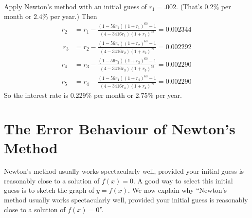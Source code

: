 \begin{eg}[interest rate]
Apply Newton's method with an initial guess of $r_1=.002$. 
(That's $0.2$\% per month or 2.4\% per year.) Then
\begin{align*}
r_2&=r_1-\frac{(1-56r_1)(1+r_1)^{60}-1}{(4-3416r_1)(1+r_1)^{59}}=0.002344\\\
r_3&=r_2-\frac{(1-56r_2)(1+r_2)^{60}-1}{(4-3416r_2)(1+r_2)^{59}}=0.002292\\
r_4&=r_3-\frac{(1-56r_3)(1+r_3)^{60}-1}{(4-3416r_3)(1+r_3)^{59}}=0.002290\\
r_5&=r_4-\frac{(1-56r_4)(1+r_4)^{60}-1}{(4-3416r_4)(1+r_4)^{59}}=0.002290
\end{align*}
So the interest rate is 0.229\% per month or 2.75\% per year.
\end{eg}

\section{The Error Behaviour of Newton's Method}\label{sec_C_2}

Newton's method usually works spectacularly well, provided your
initial guess is reasonably close to a solution of $f(x)=0$. A good way
to select this initial guess is to sketch the graph of $y=f(x)$. We
now explain why ``Newton's method usually works spectacularly 
well, provided your initial guess is reasonably close to a solution 
of $f(x)=0$''. 


